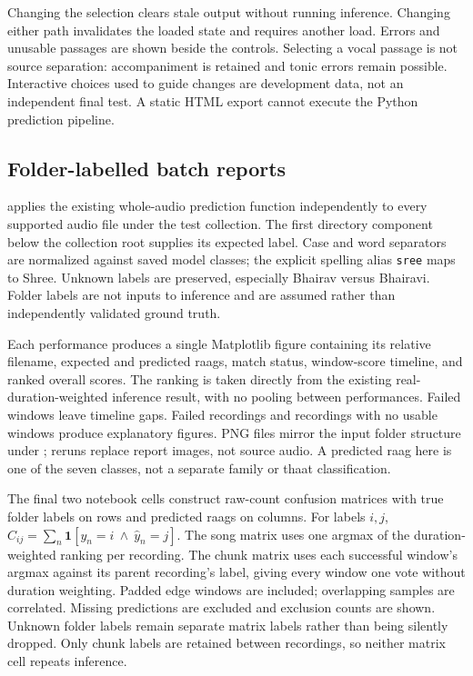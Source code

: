 \documentclass[11pt,a4paper]{article}
\begin{document}
Changing the selection clears stale output without running inference. Changing
either path invalidates the loaded state and requires another load. Errors and
unusable passages are shown beside the controls. Selecting a vocal passage is
not source separation: accompaniment is retained and tonic errors remain possible.
Interactive choices used to guide changes are development data, not an independent
final test. A static HTML export cannot execute the Python prediction pipeline.

\subsection{Folder-labelled batch reports}
 applies the existing whole-audio
prediction function independently to every supported audio file under the test
collection. The first directory component below the collection root supplies its
expected label. Case and word separators are normalized against saved model
classes; the explicit spelling alias \texttt{sree} maps to Shree. Unknown labels
are preserved, especially Bhairav versus Bhairavi. Folder labels are not inputs
to inference and are assumed rather than independently validated ground truth.

Each performance produces a single Matplotlib figure containing its relative
filename, expected and predicted raags, match status, window-score timeline,
and ranked overall scores. The ranking is taken directly from the existing
real-duration-weighted inference result, with no pooling between performances.
Failed windows leave timeline gaps. Failed recordings and recordings with no
usable windows produce explanatory figures. PNG files mirror the input folder
structure under ; reruns replace report images,
not source audio. A predicted raag here is one of the seven classes, not a
separate family or thaat classification.

The final two notebook cells construct raw-count confusion matrices with true
folder labels on rows and predicted raags on columns. For labels $i,j$,
$C_{ij}=\sum_n\mathbf{1}[y_n=i\ \wedge\ \widehat y_n=j]$.
The song matrix uses one argmax of the duration-weighted ranking per recording.
The chunk matrix uses each successful window's argmax against its parent
recording's label, giving every window one vote without duration weighting.
Padded edge windows are included; overlapping samples are correlated. Missing
predictions are excluded and exclusion counts are shown. Unknown folder labels
remain separate matrix labels rather than being silently dropped. Only chunk
labels are retained between recordings, so neither matrix cell repeats inference.
\end{document}
